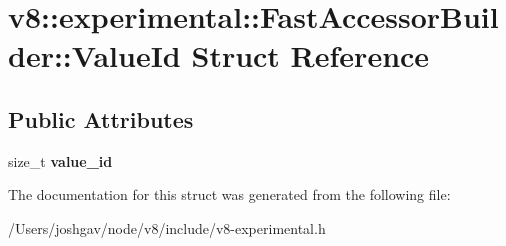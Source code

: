 \hypertarget{structv8_1_1experimental_1_1_fast_accessor_builder_1_1_value_id}{}\section{v8\+:\+:experimental\+:\+:Fast\+Accessor\+Builder\+:\+:Value\+Id Struct Reference}
\label{structv8_1_1experimental_1_1_fast_accessor_builder_1_1_value_id}
\subsection*{Public Attributes}
\begin{DoxyCompactItemize}
\item 
size\+\_\+t {\bfseries value\+\_\+id}\hypertarget{structv8_1_1experimental_1_1_fast_accessor_builder_1_1_value_id_ab344ca323c52a8efce5855a853bffe86}{}\label{structv8_1_1experimental_1_1_fast_accessor_builder_1_1_value_id_ab344ca323c52a8efce5855a853bffe86}

\end{DoxyCompactItemize}


The documentation for this struct was generated from the following file\+:\begin{DoxyCompactItemize}
\item 
/\+Users/joshgav/node/v8/include/v8-\/experimental.\+h\end{DoxyCompactItemize}
